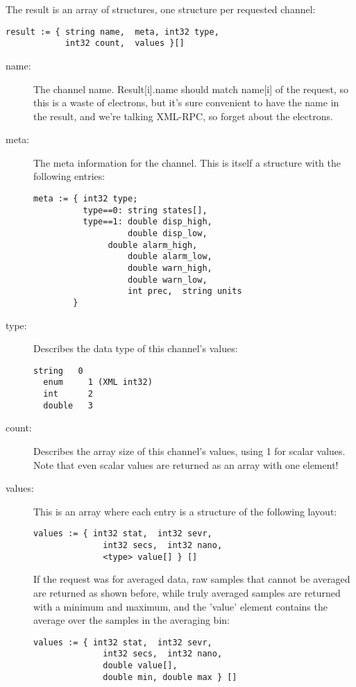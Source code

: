 \noindent The result is an array of structures,  one structure per
requested channel:

\begin{lstlisting}[keywordstyle=\sffamily]
result := { string name,  meta, int32 type,
            int32 count,  values }[]
\end{lstlisting}

\begin{description}
\item[\sffamily name:]
   The channel name.
   Result[i].name should match name[i] of the request, 
   so this is a waste of electrons,  but it's sure convenient
   to have the name in the result,  and we're talking XML-RPC,
   so forget about the electrons.
\item[\sffamily meta:]
   The meta information for the channel. This is itself a structure 
   with the following entries:
   \begin{lstlisting}[keywordstyle=\sffamily]
meta := { int32 type;
          type==0: string states[], 
          type==1: double disp_high, 
                   double disp_low, 
	           double alarm_high, 
                   double alarm_low, 
                   double warn_high, 
                   double warn_low, 
                   int prec,  string units
        }
   \end{lstlisting}
\item[\sffamily type:]
   Describes the data type of this channel's values:
  \begin{lstlisting}[frame=none, keywordstyle=\sffamily]
  string   0
  enum	   1 (XML int32)
  int      2
  double   3
  \end{lstlisting}
\item[\sffamily count:]
  Describes the array size of this channel's values,  using 1 for
  scalar values. Note that even scalar values are returned as an array
  with one element!
\item[\sffamily values:]
  This is an array where each entry is a structure of the following
  layout:
  \begin{lstlisting}[frame=none, keywordstyle=\sffamily]
  values := { int32 stat,  int32 sevr,
              int32 secs,  int32 nano,
              <type> value[] } []
  \end{lstlisting}
  
  If the request was for averaged data, raw samples that cannot be averaged
  are returned as shown before, while truly averaged samples are returned with
  a minimum and maximum, and the 'value' element contains the average
  over the samples in the averaging bin:
  \begin{lstlisting}[frame=none, keywordstyle=\sffamily]
  values := { int32 stat,  int32 sevr,
              int32 secs,  int32 nano,
              double value[],
              double min, double max } []
  \end{lstlisting}
\end{description}

